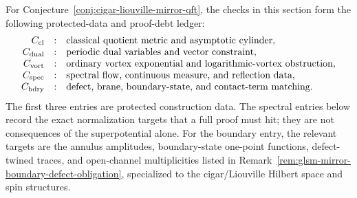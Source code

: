 For Conjecture~\ref{conj:cigar-liouville-mirror-qft}, the checks in this
section form the following protected-data and proof-debt ledger:
\[
  \begin{array}{rcl}
    C_{\rm cl} &:& \hbox{classical quotient metric and asymptotic cylinder},\\
    C_{\rm dual} &:& \hbox{periodic dual variables and vector constraint},\\
    C_{\rm vort} &:& \hbox{ordinary vortex exponential and logarithmic-vortex obstruction},\\
    C_{\rm spec} &:& \hbox{spectral flow, continuous measure, and reflection data},\\
    C_{\rm bdry} &:& \hbox{defect, brane, boundary-state, and contact-term matching}.
  \end{array}
\]
The first three entries are protected construction data.  The spectral entries
below record the exact normalization targets that a full proof must hit; they
are not consequences of the superpotential alone.
For the boundary entry, the relevant targets are the annulus amplitudes,
boundary-state one-point functions, defect-twined traces, and open-channel
multiplicities listed in
Remark~\ref{rem:glsm-mirror-boundary-defect-obligation}, specialized
to the cigar/Liouville Hilbert space and spin structures.

